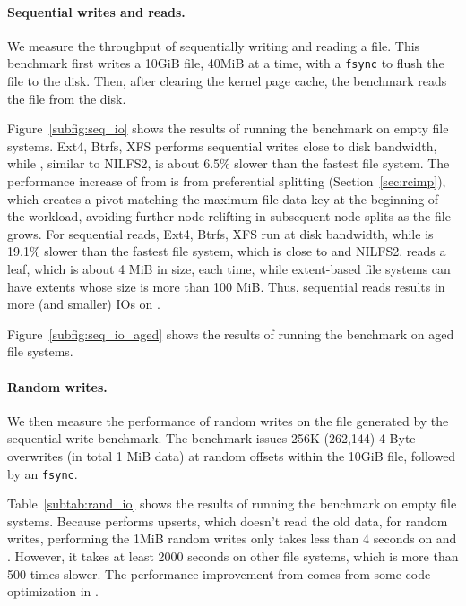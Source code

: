 \paragraph{Sequential writes and reads.}

We measure the throughput of sequentially writing and reading a file.
This benchmark first writes a 10GiB file, 40MiB at a time, with a
\texttt{fsync} to flush the file to the disk.
Then, after clearing the kernel page cache, the benchmark reads the file from
the disk.

Figure~\ref{subfig:seq_io} shows the results of running the benchmark on empty
file systems.
Ext4, Btrfs, XFS performs sequential
writes close to disk bandwidth, while \betrfsFive, similar to NILFS2, is about
6.5\% slower than the fastest file system.
The performance increase of \betrfsFive from \betrfsFour is from preferential
splitting (Section~\ref{sec:rcimp}),
which creates a pivot matching the maximum file data key at the
beginning of the workload, avoiding further node relifting in subsequent node
splits as the file grows.
For sequential reads, Ext4, Btrfs, XFS run at disk bandwidth, while \betrfsFive
is 19.1\% slower than the fastest file system, which is close to \betrfsFour
and NILFS2.
\betrfs reads a leaf, which is about 4 MiB in size, each time, while
extent-based file systems can have extents whose size is more than 100 MiB.
Thus, sequential reads results in more (and smaller) IOs on \betrfs.

Figure~\ref{subfig:seq_io_aged} shows the results of running the benchmark on
aged file systems.

\paragraph{Random writes.}

We then measure the performance of random writes on the file generated by the
sequential write benchmark.
The benchmark issues 256K (262,144) 4-Byte overwrites (in total 1 MiB data) at
random offsets within the 10GiB file, followed by an \texttt{fsync}.

Table~\ref{subtab:rand_io} shows the results of running the benchmark
on empty file systems.
Because \betrfs performs upserts, which doesn't read the old data, for random
writes, performing the 1MiB random writes only takes less than 4 seconds on
\betrfsFour and \betrfsFive.
However, it takes at least 2000 seconds on other file systems, which is
more than 500 times slower.
The performance improvement from \betrfsThree comes from some code optimization
in \fti.

